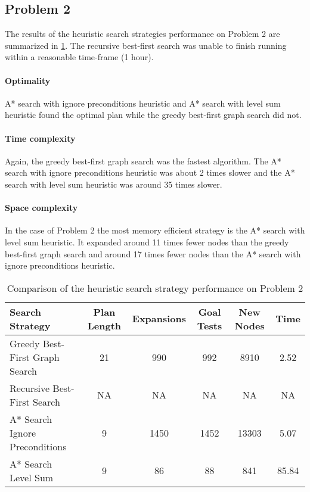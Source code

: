 \documentclass[11pt]{article}
\begin{document}
\subsection{Problem 2}

The results of the heuristic search strategies performance on Problem 2 are summarized in \ref{table:hp2}. The recursive best-first search was unable to finish running within a reasonable time-frame (1 hour).

\paragraph{Optimality}

A* search with ignore preconditions heuristic and A* search with level sum heuristic found the optimal plan while the greedy best-first graph search did not.

\paragraph{Time complexity}

Again, the greedy best-first graph search was the fastest algorithm. The A* search with ignore preconditions heuristic was about 2 times slower and the A* search with level sum heuristic was around 35 times slower.

\paragraph{Space complexity}

In the case of Problem 2 the most memory efficient strategy is the A* search with level sum heuristic. It expanded around 11 times fewer nodes than the greedy best-first graph search and around 17 times fewer nodes than the A* search with ignore preconditions heuristic.

\begin{table}[H]
  \centering
  \caption{Comparison of the heuristic search strategy performance on Problem 2}
  \bigskip
  \label{table:hp2}
  \bgroup
  \def\arraystretch{1.5}
  \begin{tabular}{p{3.7cm}|c|c|c|c|c}
    Search Strategy & Plan Length & Expansions & Goal Tests & New Nodes & Time \\
    \hline
    Greedy Best-First Graph Search & 21 & 990 & 992 & 8910 & 2.52 \\
    Recursive Best-First Search & NA & NA & NA & NA & NA \\
    A* Search Ignore Preconditions & 9 & 1450 & 1452 & 13303 & 5.07 \\
    A* Search Level Sum & 9 & 86 & 88 & 841 & 85.84 \\
  \end{tabular}
  \egroup
\end{table}
\end{document}
